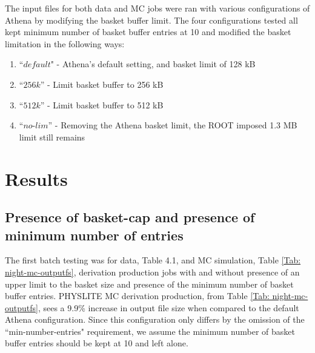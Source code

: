 The input files for both data and MC jobs were ran with various configurations of Athena by modifying the basket buffer limit. 
The four configurations tested all kept minimum number of basket buffer entries at 10 and modified the basket limitation in the following ways: 

\begin{enumerate}
    \item ``$\textit{default}$" - Athena's default setting, and basket limit of 128 kB
    \item ``$\textit{256k}$'' - Limit basket buffer to 256 kB
    \item ``$\textit{512k}$'' - Limit basket buffer to 512 kB
    \item ``$\textit{no-lim}$'' - Removing the Athena basket limit, the ROOT imposed 1.3 MB limit still remains
\end{enumerate}


\section{Results}
\label{sec:DAODProd_Results}

\subsection{Presence of basket-cap and presence of minimum number of entries}
\label{sec:DAODProd_Results_presence}

The first batch testing was for data, Table 4.1, and MC simulation, Table \ref{Tab: night-mc-outputfs}, derivation production jobs with and without presence of an upper limit to the basket size and presence of the minimum number of basket buffer entries. 
PHYSLITE MC derivation production, from Table \ref{Tab: night-mc-outputfs}, sees a 9.9\% increase in output file size when compared to the default Athena configuration. 
Since this configuration only differs by the omission of the ``min-number-entries" requirement, we assume the minimum number of basket buffer entries should be kept at 10 and left alone. 

